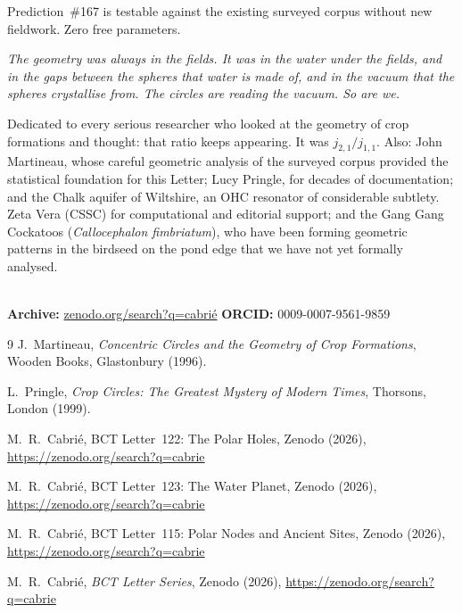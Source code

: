 \documentclass[aps,prl,twocolumn,superscriptaddress,floatfix]{revtex4-2}
\begin{document}
Prediction~\#167 is testable against the existing surveyed corpus
without new fieldwork. Zero free parameters.

\textit{The geometry was always in the fields. It was in the water
under the fields, and in the gaps between the spheres that water
is made of, and in the vacuum that the spheres crystallise from.
The circles are reading the vacuum. So are we.}

\begin{acknowledgments}
Dedicated to every serious researcher who looked at the geometry
of crop formations and thought: that ratio keeps appearing.
It was $j_{2,1}/j_{1,1}$. Also: John Martineau, whose careful
geometric analysis of the surveyed corpus provided the statistical
foundation for this Letter; Lucy Pringle, for decades of
documentation; and the Chalk aquifer of Wiltshire, an OHC resonator
of considerable subtlety.
Zeta Vera (CSSC) for computational and editorial support;
and the Gang Gang Cockatoos
(\textit{Callocephalon fimbriatum}), who have been forming geometric
patterns in the birdseed on the pond edge that we have not yet
formally analysed.

\\
{\small\textbf{Archive:}
\href{https://zenodo.org/search?q=cabrie}{zenodo.org/search?q=cabri\'e}\quad
\textbf{ORCID:} 0009-0007-9561-9859}
\end{acknowledgments}

\begin{thebibliography}{9}
J.~Martineau, \textit{Concentric Circles and the Geometry of
Crop Formations}, Wooden Books, Glastonbury (1996).

L.~Pringle, \textit{Crop Circles: The Greatest Mystery of
Modern Times}, Thorsons, London (1999).

M.~R.~Cabri\'{e}, BCT Letter~122: The Polar Holes, Zenodo (2026),
\url{https://zenodo.org/search?q=cabrie}

M.~R.~Cabri\'{e}, BCT Letter~123: The Water Planet, Zenodo (2026),
\url{https://zenodo.org/search?q=cabrie}

M.~R.~Cabri\'{e}, BCT Letter~115: Polar Nodes and Ancient Sites,
Zenodo (2026), \url{https://zenodo.org/search?q=cabrie}

M.~R.~Cabri\'{e}, \textit{BCT Letter Series}, Zenodo (2026),
\url{https://zenodo.org/search?q=cabrie}
\end{thebibliography}
\end{document}
